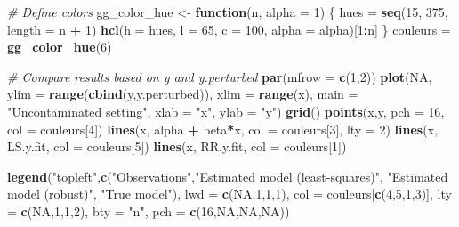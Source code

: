 \documentclass[]{book}
\newenvironment{Shaded}{\begin{snugshade}}{\end{snugshade}}
\newcommand{\CommentTok}[1]{\textcolor[rgb]{0.56,0.35,0.01}{\textit{#1}}}
\newcommand{\ControlFlowTok}[1]{\textcolor[rgb]{0.13,0.29,0.53}{\textbf{#1}}}
\newcommand{\DataTypeTok}[1]{\textcolor[rgb]{0.13,0.29,0.53}{#1}}
\newcommand{\DecValTok}[1]{\textcolor[rgb]{0.00,0.00,0.81}{#1}}
\newcommand{\KeywordTok}[1]{\textcolor[rgb]{0.13,0.29,0.53}{\textbf{#1}}}
\newcommand{\NormalTok}[1]{#1}
\newcommand{\OperatorTok}[1]{\textcolor[rgb]{0.81,0.36,0.00}{\textbf{#1}}}
\newcommand{\OtherTok}[1]{\textcolor[rgb]{0.56,0.35,0.01}{#1}}
\newcommand{\StringTok}[1]{\textcolor[rgb]{0.31,0.60,0.02}{#1}}
\theoremstyle{definition}
\theoremstyle{definition}
\theoremstyle{definition}
\theoremstyle{remark}
\begin{document}
\begin{Shaded}
\begin{Highlighting}[]
\CommentTok{# Define colors}
\NormalTok{gg_color_hue <-}\StringTok{ }\ControlFlowTok{function}\NormalTok{(n, }\DataTypeTok{alpha =} \DecValTok{1}\NormalTok{) \{}
\NormalTok{  hues =}\StringTok{ }\KeywordTok{seq}\NormalTok{(}\DecValTok{15}\NormalTok{, }\DecValTok{375}\NormalTok{, }\DataTypeTok{length =}\NormalTok{ n }\OperatorTok{+}\StringTok{ }\DecValTok{1}\NormalTok{)}
  \KeywordTok{hcl}\NormalTok{(}\DataTypeTok{h =}\NormalTok{ hues, }\DataTypeTok{l =} \DecValTok{65}\NormalTok{, }\DataTypeTok{c =} \DecValTok{100}\NormalTok{, }\DataTypeTok{alpha =}\NormalTok{ alpha)[}\DecValTok{1}\OperatorTok{:}\NormalTok{n]}
\NormalTok{\}}
\NormalTok{couleurs =}\StringTok{ }\KeywordTok{gg_color_hue}\NormalTok{(}\DecValTok{6}\NormalTok{)}

\CommentTok{# Compare results based on y and y.perturbed}
\KeywordTok{par}\NormalTok{(}\DataTypeTok{mfrow =} \KeywordTok{c}\NormalTok{(}\DecValTok{1}\NormalTok{,}\DecValTok{2}\NormalTok{))}
\KeywordTok{plot}\NormalTok{(}\OtherTok{NA}\NormalTok{, }\DataTypeTok{ylim =} \KeywordTok{range}\NormalTok{(}\KeywordTok{cbind}\NormalTok{(y,y.perturbed)), }\DataTypeTok{xlim =} \KeywordTok{range}\NormalTok{(x),}
     \DataTypeTok{main =} \StringTok{"Uncontaminated setting"}\NormalTok{, }\DataTypeTok{xlab =} \StringTok{"x"}\NormalTok{, }\DataTypeTok{ylab =} \StringTok{"y"}\NormalTok{)}
\KeywordTok{grid}\NormalTok{()}
\KeywordTok{points}\NormalTok{(x,y, }\DataTypeTok{pch =} \DecValTok{16}\NormalTok{, }\DataTypeTok{col =}\NormalTok{ couleurs[}\DecValTok{4}\NormalTok{])}
\KeywordTok{lines}\NormalTok{(x, alpha }\OperatorTok{+}\StringTok{ }\NormalTok{beta}\OperatorTok{*}\NormalTok{x, }\DataTypeTok{col =}\NormalTok{ couleurs[}\DecValTok{3}\NormalTok{], }\DataTypeTok{lty =} \DecValTok{2}\NormalTok{)}
\KeywordTok{lines}\NormalTok{(x, LS.y.fit, }\DataTypeTok{col =}\NormalTok{ couleurs[}\DecValTok{5}\NormalTok{])}
\KeywordTok{lines}\NormalTok{(x, RR.y.fit, }\DataTypeTok{col =}\NormalTok{ couleurs[}\DecValTok{1}\NormalTok{])}

\KeywordTok{legend}\NormalTok{(}\StringTok{"topleft"}\NormalTok{,}\KeywordTok{c}\NormalTok{(}\StringTok{"Observations"}\NormalTok{,}\StringTok{"Estimated model (least-squares)"}\NormalTok{,}
                   \StringTok{"Estimated model (robust)"}\NormalTok{, }\StringTok{"True model"}\NormalTok{), }
       \DataTypeTok{lwd =} \KeywordTok{c}\NormalTok{(}\OtherTok{NA}\NormalTok{,}\DecValTok{1}\NormalTok{,}\DecValTok{1}\NormalTok{,}\DecValTok{1}\NormalTok{), }\DataTypeTok{col =}\NormalTok{ couleurs[}\KeywordTok{c}\NormalTok{(}\DecValTok{4}\NormalTok{,}\DecValTok{5}\NormalTok{,}\DecValTok{1}\NormalTok{,}\DecValTok{3}\NormalTok{)],}
       \DataTypeTok{lty =} \KeywordTok{c}\NormalTok{(}\OtherTok{NA}\NormalTok{,}\DecValTok{1}\NormalTok{,}\DecValTok{1}\NormalTok{,}\DecValTok{2}\NormalTok{), }\DataTypeTok{bty =} \StringTok{"n"}\NormalTok{, }\DataTypeTok{pch =} \KeywordTok{c}\NormalTok{(}\DecValTok{16}\NormalTok{,}\OtherTok{NA}\NormalTok{,}\OtherTok{NA}\NormalTok{,}\OtherTok{NA}\NormalTok{))}


\end{Highlighting}
\end{Shaded}
\end{document}
